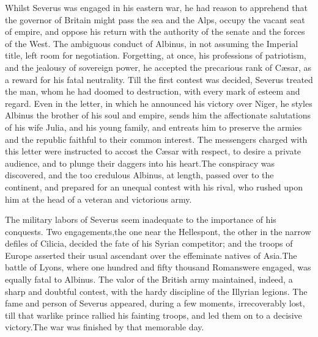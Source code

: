 



Whilst Severus was engaged in his eastern war, he had reason to
apprehend that the governor of Britain might pass the sea and the
Alps, occupy the vacant seat of empire, and oppose his return
with the authority of the senate and the forces of the West. The
ambiguous conduct of Albinus, in not assuming the Imperial title,
left room for negotiation. Forgetting, at once, his professions
of patriotism, and the jealousy of sovereign power, he accepted
the precarious rank of Cæsar, as a reward for his fatal
neutrality. Till the first contest was decided, Severus treated
the man, whom he had doomed to destruction, with every mark of
esteem and regard. Even in the letter, in which he announced his
victory over Niger, he styles Albinus the brother of his soul and
empire, sends him the affectionate salutations of his wife Julia,
and his young family, and entreats him to preserve the armies and
the republic faithful to their common interest. The messengers
charged with this letter were instructed to accost the Cæsar with
respect, to desire a private audience, and to plunge their
daggers into his heart.\footnotemark[48] The conspiracy was discovered, and the
too credulous Albinus, at length, passed over to the continent,
and prepared for an unequal contest with his rival, who rushed
upon him at the head of a veteran and victorious army.


The military labors of Severus seem inadequate to the importance
of his conquests. Two engagements,\footnotemark[481] the one near the
Hellespont, the other in the narrow defiles of Cilicia, decided
the fate of his Syrian competitor; and the troops of Europe
asserted their usual ascendant over the effeminate natives of
Asia.\footnotemark[49] The battle of Lyons, where one hundred and fifty
thousand Romans\footnotemark[50] were engaged, was equally fatal to Albinus.
The valor of the British army maintained, indeed, a sharp and
doubtful contest, with the hardy discipline of the Illyrian
legions. The fame and person of Severus appeared, during a few
moments, irrecoverably lost, till that warlike prince rallied his
fainting troops, and led them on to a decisive victory.\footnotemark[51] The
war was finished by that memorable day.\footnotemark[511]

